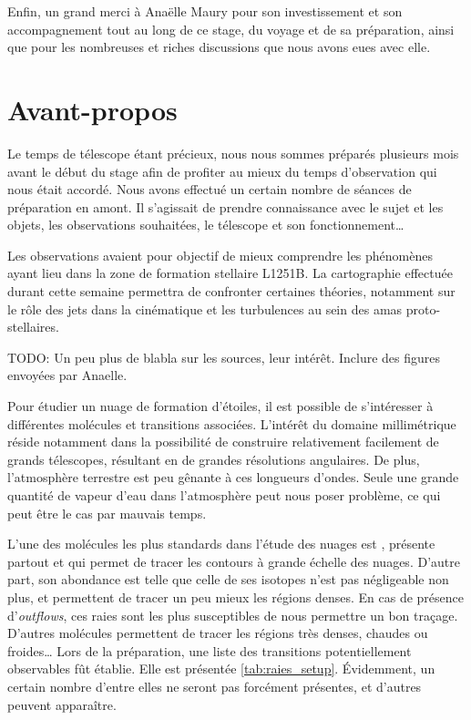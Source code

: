\documentclass[a4paper,10pt,french]{article}
\begin{document}
Enfin, un grand merci à Anaëlle Maury pour son investissement et son
accompagnement tout au long de ce stage, du voyage et de sa préparation, ainsi
que pour les nombreuses et riches discussions que nous avons eues avec elle.

\tableofcontents

\newpage


\setlength{\parindent}{16pt}
\setlength{\parskip}{1ex}

\section{Avant-propos}

Le temps de télescope étant précieux, nous nous sommes préparés plusieurs mois
avant le début du stage afin de profiter au mieux du temps d’observation qui
nous était accordé. Nous avons effectué un certain nombre de séances de
préparation en amont. Il s’agissait de prendre connaissance avec le sujet et
les objets, les observations souhaitées, le télescope et son fonctionnement…

Les observations avaient pour objectif de mieux comprendre les phénomènes ayant
lieu dans la zone de formation stellaire L1251B. La cartographie effectuée
durant cette semaine permettra de confronter certaines théories, notamment sur
le rôle des jets dans la cinématique et les turbulences au sein des amas
proto-stellaires.

TODO: Un peu plus de blabla sur les sources, leur intérêt. Inclure des figures
envoyées par Anaelle.

Pour étudier un nuage de formation d’étoiles, il est possible de s’intéresser à
différentes molécules et transitions associées. L’intérêt du domaine
millimétrique réside notamment dans la possibilité de construire relativement
facilement de grands télescopes, résultant en de grandes résolutions
angulaires. De plus, l’atmosphère terrestre est peu gênante à ces longueurs
d’ondes. Seule une grande quantité de vapeur d’eau dans l’atmosphère peut nous
poser problème, ce qui peut être le cas par mauvais temps.

L’une des molécules les plus standards dans l’étude des nuages est ,
présente partout et qui permet de tracer les contours à grande échelle des
nuages. D’autre part, son abondance est telle que celle de ses isotopes n’est
pas négligeable non plus,  et  permettent de tracer un peu
mieux les régions denses. En cas de présence d’\textit{outflows}, ces raies
sont les plus susceptibles de nous permettre un bon traçage. D’autres molécules
permettent de tracer les régions très denses, chaudes ou froides… Lors de la
préparation, une liste des transitions potentiellement observables fût établie.
Elle est présentée \cref{tab:raies_setup}. Évidemment, un certain nombre
d’entre elles ne seront pas forcément présentes, et d’autres peuvent
apparaître.
\end{document}
